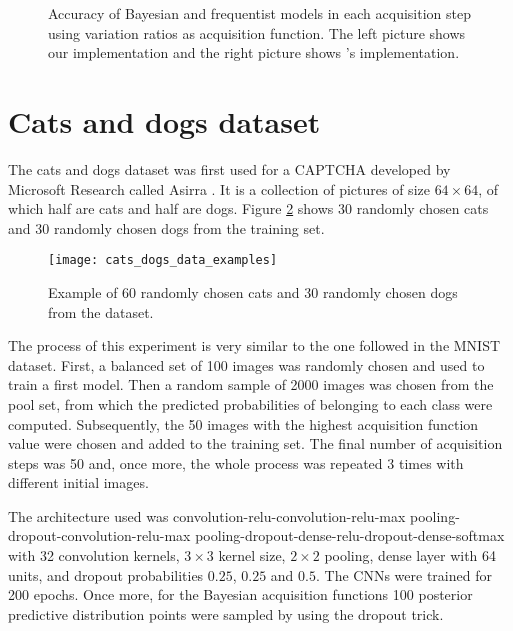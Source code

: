 \begin{figure}[H]
  \centering
  \hfill
  \caption{Accuracy of Bayesian and frequentist models in each acquisition step using variation ratios as acquisition function. The left picture shows our implementation and the right picture shows \citeauthor{Gal2016Active}'s implementation.}
  \label{fig:mnist_var_ratios_AL}
\end{figure}


\section{Cats and dogs dataset}

The cats and dogs dataset was first used for a CAPTCHA developed by Microsoft Research called Asirra \cite{elson2007asirra}. It is a collection of  pictures of size $64 \times 64$, of which half are cats and half are dogs. Figure \ref{fig:cats_dogs_data_examples} shows 30 randomly chosen cats and 30 randomly chosen dogs from the training set.

\begin{figure}[H]
    \centering
    \texttt{[image: cats\_dogs\_data\_examples]}
    \caption{Example of 60 randomly chosen cats and 30 randomly chosen dogs from the dataset.}
    \label{fig:cats_dogs_data_examples}
\end{figure}

The process of this experiment is very similar to the one followed in the MNIST dataset. First, a balanced set of 100 images was randomly chosen and used to train a first model. Then a random sample of 2000 images was chosen from the pool set, from which the predicted probabilities of belonging to each class were computed. Subsequently, the 50 images with the highest acquisition function value were chosen and added to the training set. The final number of acquisition steps was 50 and, once more, the whole process was repeated 3 times with different initial images.

The architecture used was convolution-relu-convolution-relu-max pooling-dropout-convolution-relu-max pooling-dropout-dense-relu-dropout-dense-softmax with 32 convolution kernels, $3 \times 3$ kernel size, $2 \times 2$ pooling, dense layer with 64 units, and dropout probabilities $0.25$, $0.25$ and $0.5$. The CNNs were trained for 200 epochs. Once more, for the Bayesian acquisition functions 100 posterior predictive distribution points were sampled by using the dropout trick.

